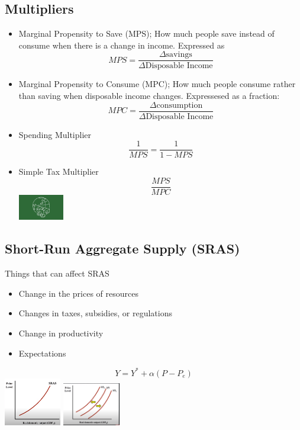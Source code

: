 \documentclass[8pt]{beamer}
\begin{document}
  \begin{frame}
	\section{Multipliers}
	\begin{itemize}
		\item Marginal Propensity to Save (MPS); How much people save instead of
		consume when there is a change in income. Expressed as $$MPS=\frac{\Delta \text{savings}}{\Delta \text {Disposable Income}}$$
		\item Marginal Propensity to Consume (MPC); How much people consume
		rather than saving when disposable income changes. Expressesed as a fraction:
		$$MPC = \frac{\Delta \text{consumption}}{\Delta \text{Disposable Income}}$$
		\item Spending Multiplier
		$$\frac{1}{MPS} = \frac{1}{1 - MPS}$$
		\item Simple Tax Multiplier
		$$\frac{MPS}{MPC}$$
		\center \includegraphics[width=2cm]{2021-10-12-12-10-06.png}
	\end{itemize}
  \end{frame}
  \begin{frame}
	\section{Short-Run Aggregate Supply (SRAS)}
	Things that can affect SRAS
	\begin{itemize}
		\item Change in the prices of resources
		\item Changes in taxes, subsidies, or regulations
		\item Change in productivity
		\item Expectations
	\end{itemize}
	$$Y = Y^* + \alpha(P-P_e)$$
	\includegraphics[width=2.5cm]{2021-10-12-12-11-36.png} \includegraphics[width=2.5cm]{2021-10-12-12-12-26.png}
  \end{frame}
\end{document}
